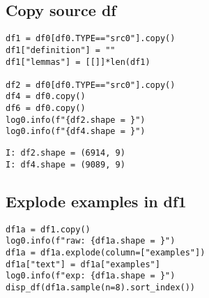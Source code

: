 \documentclass[a4paper,10pt,onecolumn,oneside,openright]{article}
\begin{document}
\subsection{Copy source df}
\label{sec:org9c5d424}
\begin{verbatim}
df1 = df0[df0.TYPE=="src0"].copy()
df1["definition"] = ""
df1["lemmas"] = [[]]*len(df1)

df2 = df0[df0.TYPE=="src0"].copy()
df4 = df0.copy()
df6 = df0.copy()
log0.info(f"{df2.shape = }")
log0.info(f"{df4.shape = }")
\end{verbatim}

\begin{verbatim}
I: df2.shape = (6914, 9)
I: df4.shape = (9089, 9)
\end{verbatim}

\subsection{Explode examples in df1}
\label{sec:org87785ad}
\begin{verbatim}
df1a = df1.copy()
log0.info(f"raw: {df1a.shape = }")
df1a = df1a.explode(column=["examples"])
df1a["text"] = df1a["examples"]
log0.info(f"exp: {df1a.shape = }")
disp_df(df1a.sample(n=8).sort_index())
\end{verbatim}
\end{document}
